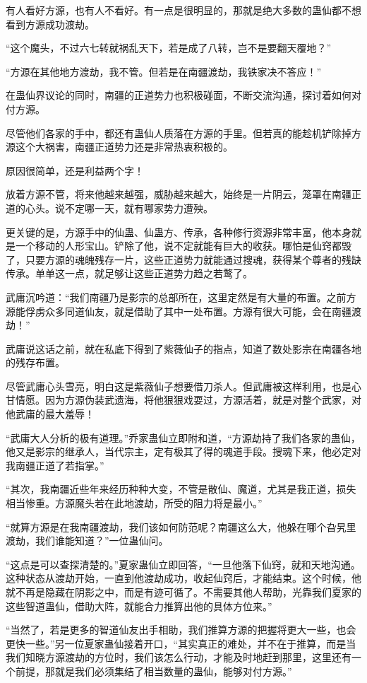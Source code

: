 \begin{this_body}
有人看好方源，也有人不看好。有一点是很明显的，那就是绝大多数的蛊仙都不想看到方源成功渡劫。

“这个魔头，不过六七转就祸乱天下，若是成了八转，岂不是要翻天覆地？”

“方源在其他地方渡劫，我不管。但若是在南疆渡劫，我铁家决不答应！”

在蛊仙界议论的同时，南疆的正道势力也积极碰面，不断交流沟通，探讨着如何对付方源。

尽管他们各家的手中，都还有蛊仙人质落在方源的手里。但若真的能趁机铲除掉方源这个大祸害，南疆正道势力还是非常热衷积极的。

原因很简单，还是利益两个字！

放着方源不管，将来他越来越强，威胁越来越大，始终是一片阴云，笼罩在南疆正道的心头。说不定哪一天，就有哪家势力遭殃。

更关键的是，方源手中的仙蛊、仙蛊方、传承，各种修行资源非常丰富，他本身就是一个移动的人形宝山。铲除了他，说不定就能有巨大的收获。哪怕是仙窍都毁了，只要方源的魂魄残存一片，这些正道势力就能通过搜魂，获得某个尊者的残缺传承。单单这一点，就足够让这些正道势力趋之若鹜了。

武庸沉吟道：“我们南疆乃是影宗的总部所在，这里定然是有大量的布置。之前方源能俘虏众多同道仙友，就是借助了其中一处布置。方源有很大可能，会在南疆渡劫！”

武庸说这话之前，就在私底下得到了紫薇仙子的指点，知道了数处影宗在南疆各地的残存布置。

尽管武庸心头雪亮，明白这是紫薇仙子想要借刀杀人。但武庸被这样利用，也是心甘情愿。因为方源伪装武遗海，将他狠狠戏耍过，方源活着，就是对整个武家，对他武庸的最大羞辱！

“武庸大人分析的极有道理。”乔家蛊仙立即附和道，“方源劫持了我们各家的蛊仙，他又是影宗的继承人，当代宗主，定有极其了得的魂道手段。搜魂下来，他必定对我南疆正道了若指掌。”

“其次，我南疆近些年来经历种种大变，不管是散仙、魔道，尤其是我正道，损失相当惨重。方源魔头若在此地渡劫，所受的阻力将是最小。”

“就算方源是在我南疆渡劫，我们该如何防范呢？南疆这么大，他躲在哪个旮旯里渡劫，我们谁能知道？”一位蛊仙问。

“这点是可以查探清楚的。”夏家蛊仙立即回答，“一旦他落下仙窍，就和天地沟通。这种状态从渡劫开始，一直到他渡劫成功，收起仙窍后，才能结束。这个时候，他就不再是隐藏在阴影之中，而是有迹可循了。不需要其他人帮助，光靠我们夏家的这些智道蛊仙，借助大阵，就能合力推算出他的具体方位来。”

“当然了，若是更多的智道仙友出手相助，我们推算方源的把握将更大一些，也会更快一些。”另一位夏家蛊仙接着开口，“其实真正的难处，并不在于推算，而是当我们知晓方源渡劫的方位时，我们该怎么行动，才能及时地赶到那里，这里还有一个前提，那就是我们必须集结了相当数量的蛊仙，能够对付方源。”


\end{this_body}
